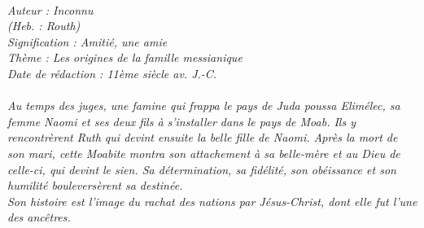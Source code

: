 \BFont
\noindent\hrulefill
{\footnotesize
\textit{
\bigskip
{\centering{}
\\Auteur : Inconnu
\\(Heb. : Routh)
\\Signification : Amitié, une amie
\\Thème : Les origines de la famille messianique
\\Date de rédaction : 11ème siècle av. J.-C.\\}
}
\textit{
\\Au temps des juges, une famine qui frappa le pays de Juda poussa Elimélec, sa femme Naomi et ses deux fils à s’installer dans le pays de Moab. Ils y rencontrèrent Ruth qui devint ensuite la belle fille de Naomi. Après la mort de son mari, cette Moabite montra son attachement à sa belle-mère et au Dieu de celle-ci, qui devint le sien. Sa détermination, sa fidélité, son obéissance et son humilité bouleversèrent sa destinée.
\\Son histoire est l'image du rachat des nations par Jésus-Christ, dont elle fut l'une des ancêtres.\bigskip
}
}
\par\nobreak\noindent\hrulefill
